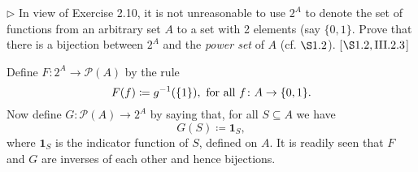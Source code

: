 \begin{exercise}
	\(\triangleright\) In view of Exercise 2.10, it is not unreasonable to use \(2^A\) to denote the set of functions from an arbitrary set \(A\) to a set with 2 elements (say \(\{0, 1\}\). Prove that there is a bijection between \(2^A\) and the \textit{power set} of \(A\) (cf. \(\S 1.2\)). [\(\S 1.2, \RNo{3}.2.3\)]
\end{exercise}
\begin{solution}
	Define $F\colon 2^A \to \mathscr{P}(A)$ by the rule
	\[
		F(f) \coloneqq g^{-1}(\{1\}),\textnormal{ for all }f\colon A \to \{0,1\}.
	\]
	Now define $G\colon \mathscr{P}(A) \to 2^A$ by saying that, for all $S \subseteq A$ we have
	\[
		G(S) \coloneqq \mathbf{1}_S,
	\]
	where $\mathbf{1}_S$ is the indicator function of $S$, defined on $A$. It is readily seen that $F$ and $G$ are inverses of each other and hence bijections.
\end{solution}